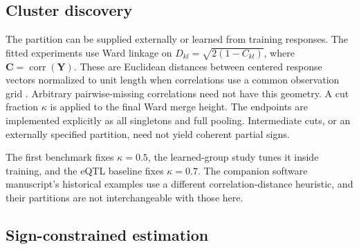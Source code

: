 \documentclass[lineno,pdflatex,sn-basic]{sn-jnl}
\theoremstyle{thmstyleone}
\begin{document}
\subsection{Cluster discovery} \label{sec:hcgl}

The partition can be supplied externally or learned from training responses.
The fitted experiments use Ward linkage on $D_{kl}=\sqrt{2(1-C_{kl})}$,
where $\bm C=\operatorname{corr}(\bm Y)$. These are Euclidean distances between
centered response vectors normalized to unit length when correlations use a
common observation grid \citep{Ward:1963,Murtagh+Legendre:2014}. Arbitrary
pairwise-missing correlations need not have this geometry. A cut fraction
$\kappa$ is applied to the final Ward merge height. The endpoints are
implemented explicitly as all singletons and full pooling. Intermediate cuts,
or an externally specified partition, need not yield coherent partial signs.

The first benchmark fixes $\kappa=0.5$, the learned-group study tunes it inside
training, and the eQTL baseline fixes $\kappa=0.7$. The companion software
manuscript's historical examples use a different correlation-distance
heuristic, and their partitions are not interchangeable with those here.

\subsection{Sign-constrained estimation} \label{sec:sgl-sign}
\end{document}
